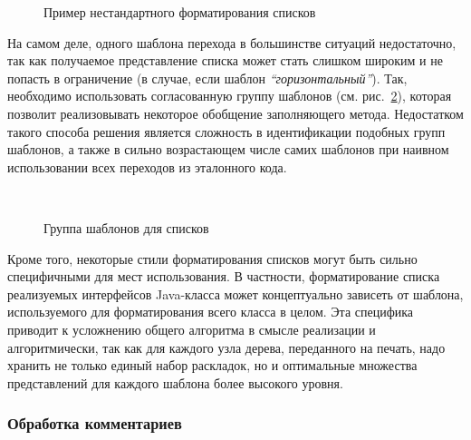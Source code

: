\begin{figure}[h!]
  
  \caption{Пример нестандартного форматирования списков}
  \label{fig:listGoodLine}
\end{figure}

На самом деле, одного шаблона перехода 
в большинстве ситуаций недостаточно,
так как получаемое представление списка может стать слишком широким и не попасть
в ограничение (в случае, если шаблон \emph{``горизонтальный''}).
Так, необходимо использовать согласованную группу шаблонов
(см. рис.~\ref{fig:tmpltGroup}), которая
позволит реализовывать некоторое обобщение заполняющего метода.
Недостатком такого способа решения является сложность в идентификации подобных
групп шаблонов, а также в сильно возрастающем числе самих шаблонов при наивном
использовании всех переходов из эталонного кода.

\begin{figure}[h!]
  \centering
  ~
  \caption{Группа шаблонов для списков}
  \label{fig:tmpltGroup}
\end{figure}

Кроме того, некоторые стили
форматирования списков могут быть сильно специфичными для мест использования.
В частности, форматирование списка реализуемых интерфейсов Java-класса может
концептуально зависеть от шаблона, используемого для форматирования всего класса
в целом. Эта специфика приводит к усложнению общего алгоритма в смысле реализации
и алгоритмически, так как для каждого узла дерева, переданного на печать,
надо хранить не только единый набор раскладок, но и оптимальные
множества представлений для каждого шаблона более высокого уровня.




\newpage
\subsubsection{Обработка комментариев}

